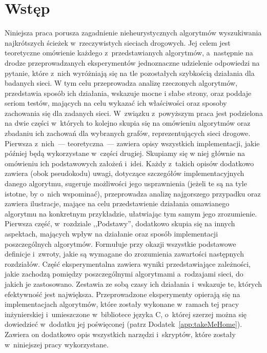 \chapter{Wstęp}
\thispagestyle{chapterBeginStyle}

Niniejsza praca porusza zagadnienie nieheurystycznych algorytmów wyszukiwania najkrótszych ścieżek w~rzeczywistych sieciach drogowych.
Jej celem jest teoretyczne omówienie każdego z~przedstawianych algorytmów, a~następnie na drodze przeprowadzanych eksperymentów jednoznaczne udzielenie odpowiedzi na pytanie, które z~nich wyróżniają się na tle pozostałych szybkością działania dla badanych sieci.
W tym celu przeprowadza analizę rzeczonych algorytmów, przedstawia sposób ich działania, wskazuje mocne i słabe strony, oraz poddaje seriom testów, mających na celu wykazać ich właściwości oraz sposoby zachowania się dla zadanych sieci.
W~związku z~powyższym praca jest podzielona na dwie części w~których to kolejno skupia się na omówieniu algorytmów oraz zbadaniu ich zachowań dla wybranych grafów, reprezentujących sieci drogowe.
Pierwsza z~nich~--- teoretyczna~--- zawiera opisy wszystkich implementacji, jakie później będą wykorzystane w~części drugiej.
Skupiamy się w niej głównie na omówieniu ich podstawowych założeń i~idei.
Każdy z~takich opisów dodatkowo zawiera (obok pseudokodu) uwagi, dotyczące szczegółów implementacyjnych danego algorytmu, sugeruje możliwości jego usprawnienia (jeżeli te są na tyle istotne, by o~nich wspominać), przeprowadza analizę najgorszego przypadku oraz zawiera ilustracje, mające na celu przedstawienie działania omawianego algorytmu na konkretnym przykładzie, ułatwiając tym samym jego zrozumienie.
Pierwsza część, w~rozdziale ,,Podstawy'', dodatkowo skupia się na innych aspektach, mających wpływ na działanie oraz sposób implementacji poszczególnych algorytmów.
Formułuje przy okazji wszystkie podstawowe definicje i~zwroty, jakie są wymagane do zrozumienia zawartości następnych rozdziałów.
Część eksperymentalna zawiera wyniki przedstawiające zależności, jakie zachodzą pomiędzy poszczególnymi algorytmami a~rodzajami sieci, do jakich je zastosowano.
Zestawia ze sobą czasy ich działania i~wskazuje te, których efektywność jest największa.
Przeprowadzone eksperymenty opierają się na implementacjach algorytmów, które zostały wykonane w~ramach tej pracy inżynierskiej i~umieszczone w~bibliotece języka \textsc{C}, o~której szerzej można się dowiedzieć w~dodatku jej poświęconej (patrz Dodatek~\ref{app:takeMeHome}).
Zawiera on dodatkowo opis wszystkich narzędzi i~skryptów, które zostały w~niniejszej pracy wykorzystane.

